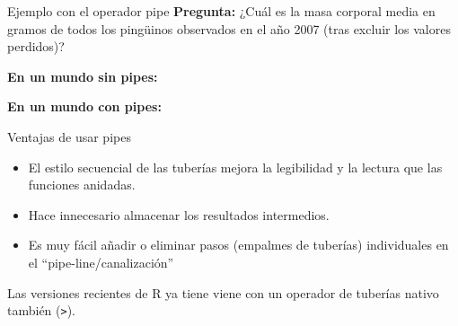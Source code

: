 \documentclass[
  ignorenonframetext,
  aspectratio=169]{beamer}
\newenvironment{Shaded}{\begin{snugshade}}{\end{snugshade}}
\newcommand{\AttributeTok}[1]{\textcolor[rgb]{0.77,0.63,0.00}{#1}}
\newcommand{\CommentTok}[1]{\textcolor[rgb]{0.56,0.35,0.01}{\textit{#1}}}
\newcommand{\DecValTok}[1]{\textcolor[rgb]{0.00,0.00,0.81}{#1}}
\newcommand{\FunctionTok}[1]{\textcolor[rgb]{0.00,0.00,0.00}{#1}}
\newcommand{\NormalTok}[1]{#1}
\newcommand{\OtherTok}[1]{\textcolor[rgb]{0.56,0.35,0.01}{#1}}
\newcommand{\SpecialCharTok}[1]{\textcolor[rgb]{0.00,0.00,0.00}{#1}}
\begin{document}
\begin{frame}[fragile]{Ejemplo con el operador pipe}
\protect\hypertarget{ejemplo-con-el-operador-pipe}{}
\textbf{Pregunta:} ¿Cuál es la masa corporal media en gramos de todos
los pingüinos observados en el año 2007 (tras excluir los valores
perdidos)?

\textbf{En un mundo sin pipes:}

\begin{Shaded}
\end{Shaded}

\textbf{En un mundo con pipes:}

\begin{Shaded}
\end{Shaded}
\end{frame}

\begin{frame}[fragile]{Ventajas de usar pipes}
\protect\hypertarget{ventajas-de-usar-pipes}{}
\begin{itemize}
\item
  El estilo secuencial de las tuberías mejora la legibilidad y la
  lectura que las funciones anidadas.
\item
  Hace innecesario almacenar los resultados intermedios.
\item
  Es muy fácil añadir o eliminar pasos (empalmes de tuberías)
  individuales en el ``pipe-line/canalización''
\end{itemize}

\hfill\break

Las versiones recientes de R ya tiene viene con un operador de tuberías
nativo también (\texttt{\textbar{}\textgreater{}}).
\end{frame}
\end{document}
